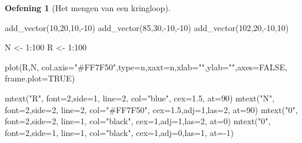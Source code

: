 \documentclass[
  a4paper,
]{scrbook}
\newenvironment{Shaded}{\begin{snugshade}}{\end{snugshade}}
\newcommand{\AttributeTok}[1]{\textcolor[rgb]{0.40,0.45,0.13}{#1}}
\newcommand{\ConstantTok}[1]{\textcolor[rgb]{0.56,0.35,0.01}{#1}}
\newcommand{\DecValTok}[1]{\textcolor[rgb]{0.68,0.00,0.00}{#1}}
\newcommand{\FloatTok}[1]{\textcolor[rgb]{0.68,0.00,0.00}{#1}}
\newcommand{\FunctionTok}[1]{\textcolor[rgb]{0.28,0.35,0.67}{#1}}
\newcommand{\NormalTok}[1]{\textcolor[rgb]{0.00,0.23,0.31}{#1}}
\newcommand{\OtherTok}[1]{\textcolor[rgb]{0.00,0.23,0.31}{#1}}
\newcommand{\SpecialCharTok}[1]{\textcolor[rgb]{0.37,0.37,0.37}{#1}}
\newcommand{\StringTok}[1]{\textcolor[rgb]{0.13,0.47,0.30}{#1}}
\theoremstyle{definition}
\newtheorem{exercise}{Oefening}[chapter]
\theoremstyle{remark}
\begin{document}
\begin{exercise}[Het mengen van een
kringloop]
\begin{Shaded}
\begin{Highlighting}[]
\FunctionTok{add\_vector}\NormalTok{(}\DecValTok{10}\NormalTok{,}\DecValTok{20}\NormalTok{,}\DecValTok{10}\NormalTok{,}\SpecialCharTok{{-}}\DecValTok{10}\NormalTok{)}
\FunctionTok{add\_vector}\NormalTok{(}\DecValTok{85}\NormalTok{,}\DecValTok{30}\NormalTok{,}\SpecialCharTok{{-}}\DecValTok{10}\NormalTok{,}\SpecialCharTok{{-}}\DecValTok{10}\NormalTok{)}
\FunctionTok{add\_vector}\NormalTok{(}\DecValTok{102}\NormalTok{,}\DecValTok{20}\NormalTok{,}\SpecialCharTok{{-}}\DecValTok{10}\NormalTok{,}\DecValTok{10}\NormalTok{)}

\NormalTok{N }\OtherTok{\textless{}{-}} \DecValTok{1}\SpecialCharTok{:}\DecValTok{100}
\NormalTok{R }\OtherTok{\textless{}{-}} \DecValTok{1}\SpecialCharTok{:}\DecValTok{100}

\FunctionTok{plot}\NormalTok{(R,N,  }\AttributeTok{col.axis=}\StringTok{"\#FF7F50"}\NormalTok{,}\AttributeTok{type=}\StringTok{\textquotesingle{}n\textquotesingle{}}\NormalTok{,}\AttributeTok{xaxt=}\StringTok{\textquotesingle{}n\textquotesingle{}}\NormalTok{,}\AttributeTok{xlab=}\StringTok{""}\NormalTok{,}\AttributeTok{ylab=}\StringTok{""}\NormalTok{,}\AttributeTok{axes=}\ConstantTok{FALSE}\NormalTok{, }\AttributeTok{frame.plot=}\ConstantTok{TRUE}\NormalTok{)}

\FunctionTok{mtext}\NormalTok{(}\StringTok{"R"}\NormalTok{, }\AttributeTok{font=}\DecValTok{2}\NormalTok{,}\AttributeTok{side=}\DecValTok{1}\NormalTok{, }\AttributeTok{line=}\DecValTok{2}\NormalTok{, }\AttributeTok{col=}\StringTok{"blue"}\NormalTok{, }\AttributeTok{cex=}\FloatTok{1.5}\NormalTok{, }\AttributeTok{at=}\DecValTok{90}\NormalTok{)}
\FunctionTok{mtext}\NormalTok{(}\StringTok{"N"}\NormalTok{, }\AttributeTok{font=}\DecValTok{2}\NormalTok{,}\AttributeTok{side=}\DecValTok{2}\NormalTok{, }\AttributeTok{line=}\DecValTok{2}\NormalTok{, }\AttributeTok{col=}\StringTok{"\#FF7F50"}\NormalTok{, }\AttributeTok{cex=}\FloatTok{1.5}\NormalTok{,}\AttributeTok{adj=}\DecValTok{1}\NormalTok{,}\AttributeTok{las=}\DecValTok{2}\NormalTok{, }\AttributeTok{at=}\DecValTok{90}\NormalTok{)}
\FunctionTok{mtext}\NormalTok{(}\StringTok{"0"}\NormalTok{, }\AttributeTok{font=}\DecValTok{2}\NormalTok{,}\AttributeTok{side=}\DecValTok{2}\NormalTok{, }\AttributeTok{line=}\DecValTok{1}\NormalTok{, }\AttributeTok{col=}\StringTok{"black"}\NormalTok{, }\AttributeTok{cex=}\DecValTok{1}\NormalTok{,}\AttributeTok{adj=}\DecValTok{1}\NormalTok{,}\AttributeTok{las=}\DecValTok{2}\NormalTok{, }\AttributeTok{at=}\DecValTok{0}\NormalTok{)}
\FunctionTok{mtext}\NormalTok{(}\StringTok{"0"}\NormalTok{, }\AttributeTok{font=}\DecValTok{2}\NormalTok{,}\AttributeTok{side=}\DecValTok{1}\NormalTok{, }\AttributeTok{line=}\DecValTok{1}\NormalTok{, }\AttributeTok{col=}\StringTok{"black"}\NormalTok{, }\AttributeTok{cex=}\DecValTok{1}\NormalTok{,}\AttributeTok{adj=}\DecValTok{0}\NormalTok{,}\AttributeTok{las=}\DecValTok{1}\NormalTok{, }\AttributeTok{at=}\SpecialCharTok{{-}}\DecValTok{1}\NormalTok{)}


\end{Highlighting}
\end{Shaded}
\end{exercise}
\end{document}
